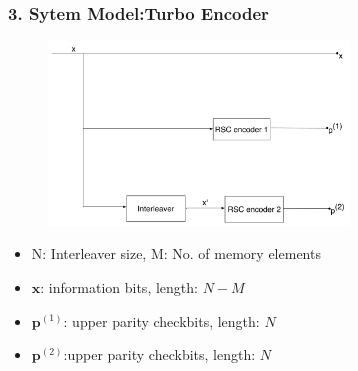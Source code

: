 \documentclass{beamer}  %
\newcommand\blfootnote[1]{%
  \begingroup
  \renewcommand\thefootnote{}\footnote{#1}%
  \addtocounter{footnote}{-1}%
  \endgroup
}
\begin{document}
\begin{frame}
\frametitle{3. Sytem Model:Turbo Encoder}

\begin{figure}
\centering
		\includegraphics[width=8cm]{TurboEncoder.pdf}
	\end{figure}


\begin{itemize}
\item N: Interleaver size, M: No. of memory elements
\item $\mathbf{x}$: information bits,  length: $N-M$
\item $\mathbf{p}^{(1)}$: upper parity checkbits, length: $N$

\item $\mathbf{p}^{(2)}$:upper parity checkbits, length: $N$
\end{itemize}

\end{frame}
\end{document}
